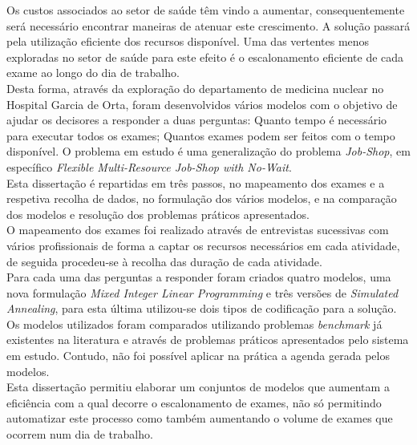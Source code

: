 
%

Os custos associados ao setor de saúde têm vindo a aumentar, consequentemente será necessário encontrar maneiras de atenuar este crescimento. A solução passará pela utilização eficiente dos recursos disponível. Uma das vertentes menos exploradas no setor de saúde para este efeito é o escalonamento eficiente de cada exame ao longo do dia de trabalho.\\
Desta forma, através da exploração do departamento de medicina nuclear no Hospital Garcia de Orta, foram desenvolvidos vários modelos com o objetivo de ajudar os decisores a responder a duas perguntas: Quanto tempo é necessário para executar todos os exames; Quantos exames podem ser feitos com o tempo disponível. O problema em estudo é uma generalização do problema \textit{Job-Shop}, em específico \textit{Flexible Multi-Resource Job-Shop with No-Wait}.\\
Esta dissertação é repartidas em três passos, no mapeamento dos exames e a respetiva recolha de dados, no formulação dos vários modelos, e na comparação dos modelos e resolução dos problemas práticos apresentados.\\
O mapeamento dos exames foi realizado através de entrevistas sucessivas com vários profissionais de forma a captar os recursos necessários em cada atividade, de seguida procedeu-se à recolha das duração de cada atividade.\\
Para cada uma das perguntas a responder foram criados quatro modelos, uma nova formulação \textit{Mixed Integer Linear Programming} e três versões de \textit{Simulated Annealing}, para esta última utilizou-se dois tipos de codificação para a solução.\\
Os modelos utilizados foram comparados utilizando problemas \textit{benchmark} já existentes na literatura e através de problemas práticos apresentados pelo sistema em estudo. Contudo, não foi possível aplicar na prática a agenda gerada pelos modelos.\\
Esta dissertação permitiu elaborar um conjuntos de modelos que aumentam a eficiência com a qual decorre o escalonamento de exames, não só permitindo automatizar este processo como também aumentando o volume de exames que ocorrem num dia de trabalho.

